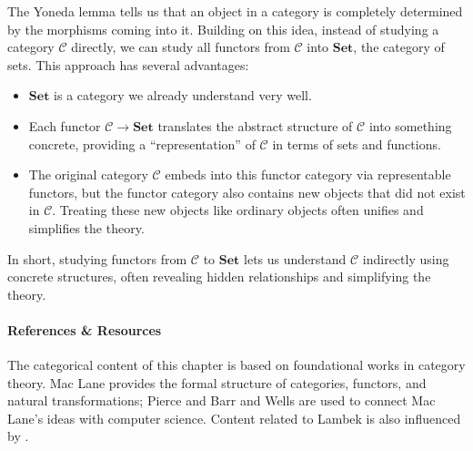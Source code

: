 The Yoneda lemma tells us that an object in a category is completely determined by the morphisms coming into it. 
Building on this idea, instead of studying a category $\mathcal{C}$ directly, we can study all functors
from $\mathcal{C}$ into $\mathbf{Set}$, the category of sets. This approach has several advantages:
\begin{itemize}
    \item $\mathbf{Set}$ is a category we already understand very well.
    \item Each functor $\mathcal{C} \to \mathbf{Set}$ translates the abstract structure of $\mathcal{C}$ 
    into something concrete, providing a ``representation'' of $\mathcal{C}$ in terms of sets and functions.
    \item The original category $\mathcal{C}$ embeds into this functor category via representable functors, 
    but the functor category also contains new objects that did not exist in $\mathcal{C}$. 
    Treating these new objects like ordinary objects often unifies and simplifies the theory.
\end{itemize}
In short, studying functors from $\mathcal{C}$ to $\mathbf{Set}$ lets us understand $\mathcal{C}$ 
indirectly using concrete structures, often revealing hidden relationships and simplifying the theory.

\paragraph{References \&  Resources}{The categorical content of this chapter is based on foundational works in category theory. Mac Lane \cite{maclane1971categories} provides the formal structure of categories, functors, and natural transformations; Pierce \cite{pierce1991basic} and Barr and Wells \cite{barr1998category} are used to connect Mac Lane's ideas with computer science. Content related to Lambek is also influenced by \cite{Jacobs1999categorical}.
}

